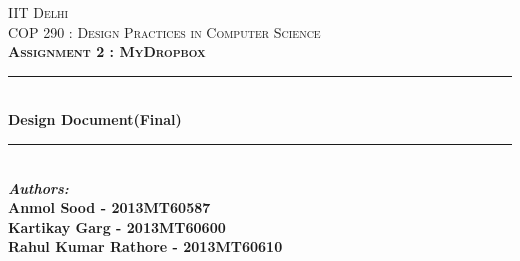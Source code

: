 \documentclass[11pt,fleqn]{book} %
\newcommand{\HRule}{\rule{\linewidth}{0.5mm}}
\begin{document}
\begin{titlepage}
\center %
 

\textsc{\LARGE IIT Delhi}\\[1.0cm] %
\textsc{\Large COP 290 : Design Practices in Computer Science}\\[0.5cm] %
\textsc{\large \textbf{Assignment 2 : MyDropbox}}\\[0.7cm] %


\HRule \\[0.4cm]
{ \huge \bfseries Design Document(Final)}\\[0.6cm] %
\HRule \\[1.5cm]
 

\emph{\textbf{Authors:}}\\
\textbf{Anmol Sood - 2013MT60587}  %
\\
\textbf{Kartikay Garg - 2013MT60600} %
\\
\textbf{Rahul Kumar Rathore - 2013MT60610}  %





\end{titlepage}
\end{document}
